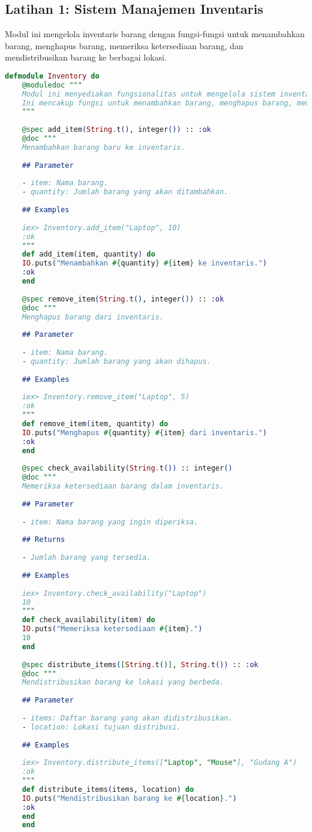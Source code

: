 \subsection{Latihan 1: Sistem Manajemen Inventaris}

Modul ini mengelola inventaris barang dengan fungsi-fungsi untuk menambahkan barang, menghapus barang, memeriksa ketersediaan barang, dan mendistribusikan barang ke berbagai lokasi.

\begin{lstlisting}[language=Elixir, caption={Modul Manajemen Inventaris}]
	defmodule Inventory do
	@moduledoc """
	Modul ini menyediakan fungsionalitas untuk mengelola sistem inventaris.
	Ini mencakup fungsi untuk menambahkan barang, menghapus barang, memeriksa ketersediaan barang, dan mendistribusikan barang ke lokasi yang berbeda.
	"""
	
	@spec add_item(String.t(), integer()) :: :ok
	@doc """
	Menambahkan barang baru ke inventaris.
	
	## Parameter
	
	- item: Nama barang.
	- quantity: Jumlah barang yang akan ditambahkan.
	
	## Examples
	
	iex> Inventory.add_item("Laptop", 10)
	:ok
	"""
	def add_item(item, quantity) do
	IO.puts("Menambahkan #{quantity} #{item} ke inventaris.")
	:ok
	end
	
	@spec remove_item(String.t(), integer()) :: :ok
	@doc """
	Menghapus barang dari inventaris.
	
	## Parameter
	
	- item: Nama barang.
	- quantity: Jumlah barang yang akan dihapus.
	
	## Examples
	
	iex> Inventory.remove_item("Laptop", 5)
	:ok
	"""
	def remove_item(item, quantity) do
	IO.puts("Menghapus #{quantity} #{item} dari inventaris.")
	:ok
	end
	
	@spec check_availability(String.t()) :: integer()
	@doc """
	Memeriksa ketersediaan barang dalam inventaris.
	
	## Parameter
	
	- item: Nama barang yang ingin diperiksa.
	
	## Returns
	
	- Jumlah barang yang tersedia.
	
	## Examples
	
	iex> Inventory.check_availability("Laptop")
	10
	"""
	def check_availability(item) do
	IO.puts("Memeriksa ketersediaan #{item}.")
	10
	end
	
	@spec distribute_items([String.t()], String.t()) :: :ok
	@doc """
	Mendistribusikan barang ke lokasi yang berbeda.
	
	## Parameter
	
	- items: Daftar barang yang akan didistribusikan.
	- location: Lokasi tujuan distribusi.
	
	## Examples
	
	iex> Inventory.distribute_items(["Laptop", "Mouse"], "Gudang A")
	:ok
	"""
	def distribute_items(items, location) do
	IO.puts("Mendistribusikan barang ke #{location}.")
	:ok
	end
	end
\end{lstlisting}

